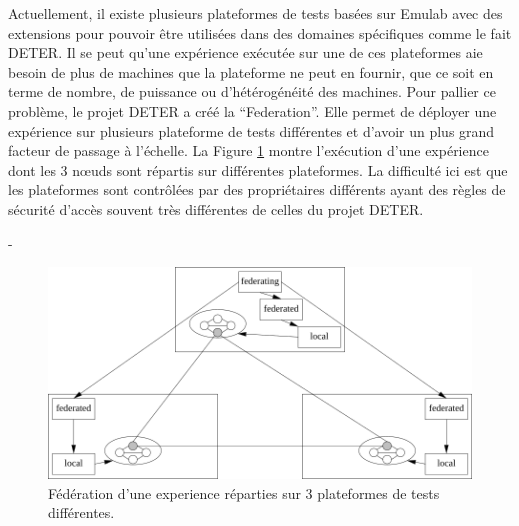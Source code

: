 Actuellement, il existe plusieurs plateformes de tests basées sur Emulab avec
des extensions pour pouvoir être utilisées dans des domaines spécifiques comme
le fait DETER. Il se peut qu'une expérience exécutée sur une de ces plateformes
aie besoin de plus de machines que la plateforme ne peut en fournir, que ce soit
en terme de nombre, de puissance ou d'hétérogénéité des machines. Pour pallier
ce problème, le projet DETER a créé la
``Federation''\citep{DETER_faber2007deter}. Elle permet de déployer une
expérience sur plusieurs plateforme de tests différentes et d'avoir un plus
grand facteur de passage à l'échelle. La Figure \ref{Federation} montre
l'exécution d'une expérience dont les 3 n\oe uds sont répartis sur différentes
plateformes. La difficulté ici est que les plateformes sont contrôlées par des
propriétaires différents ayant des règles de sécurité d'accès souvent très
différentes de celles du projet DETER.

-\begin{figure}
  \centering \includegraphics[scale=0.75]{Pictures/png/Deter_federation}
  \caption{Fédération d'une experience réparties sur 3 plateformes de tests différentes.}
  \label{Federation}
\end{figure}

